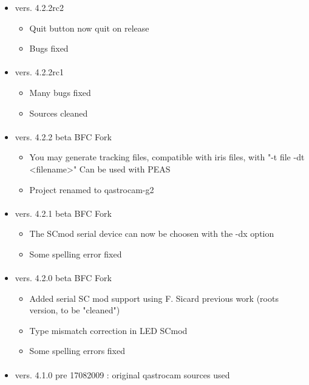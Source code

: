 \documentclass[11pt,a4paper]{book}
\begin{document}
\begin{itemize}
\paragraph*{}
\item vers. 4.2.2rc2
\begin{itemize}
\item Quit button now quit on release
\item Bugs fixed
\end{itemize}
\paragraph*{}
\item vers. 4.2.2rc1
\begin{itemize}
\item Many bugs fixed
\item Sources cleaned
\end{itemize}
\paragraph*{}
\item vers. 4.2.2 beta BFC Fork
\begin{itemize}
\item You may generate tracking files, compatible with iris files, with "-t file -dt <filename>"
  Can be used with PEAS
\item Project renamed to qastrocam-g2
\end{itemize}
\paragraph*{}
\item vers. 4.2.1 beta BFC Fork
\begin{itemize}
\item The SCmod serial device can now be choosen with the -dx option
\item Some spelling error fixed
\end{itemize}
\paragraph*{}
\item vers. 4.2.0 beta BFC Fork
\begin{itemize}
\item Added serial SC mod support using F. Sicard previous work (roots version, to be "cleaned")
\item Type mismatch correction in LED SCmod
\item Some spelling errors fixed
\end{itemize}
\paragraph*{}  
\item vers. 4.1.0 pre 17082009 : original qastrocam sources used
\end{itemize}
\end{document}
